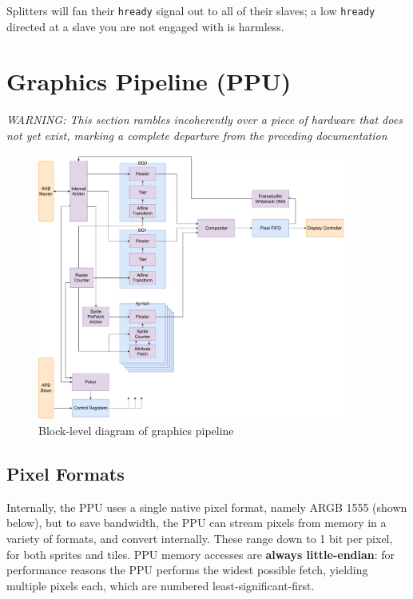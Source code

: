 \documentclass[notitlepage]{article}
\begin{document}
Splitters will fan their \texttt{hready} signal out to all of their slaves; a low \texttt{hready} directed at a slave you are not engaged with is harmless.


\section{Graphics Pipeline (PPU)}

\textit{WARNING: This section rambles incoherently over a piece of hardware that does not yet exist, marking a complete departure from the preceding documentation}

\begin{figure}[!htb]
\centering
\caption{Block-level diagram of graphics pipeline}
\includegraphics[width=0.9\textwidth]{diagrams/graphics.pdf}
\end{figure}

\subsection{Pixel Formats}

Internally, the PPU uses a single native pixel format, namely ARGB 1555 (shown below), but to save bandwidth, the PPU can stream pixels from memory in a variety of formats, and convert internally. These range down to 1 bit per pixel, for both sprites and tiles. PPU memory accesses are \textbf{always little-endian}: for performance reasons the PPU performs the widest possible fetch, yielding multiple pixels each, which are numbered least-significant-first.
\end{document}
